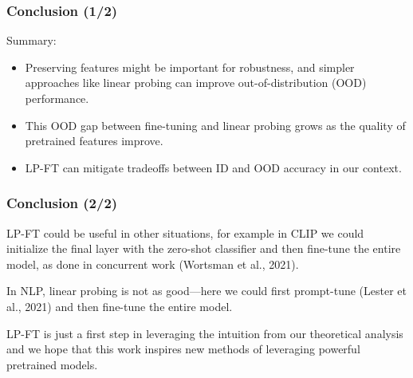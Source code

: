 \documentclass[16pt,aspectratio=169]{beamer}
\begin{document}
\begin{frame}
    \frametitle{Conclusion (1/2)}

    Summary:

    \begin{itemize}
        \item Preserving features might be important for robustness, and simpler approaches like linear probing can improve out-of-distribution (OOD) performance.
        \item This OOD gap between fine-tuning and linear probing grows as the quality of pretrained features improve.
        \item LP-FT can mitigate tradeoffs between ID and OOD accuracy in our context.
    \end{itemize}
    
\end{frame}

\begin{frame}
    \frametitle{Conclusion (2/2)}

    LP-FT could be useful in other situations, for example in CLIP we could initialize the final layer with the zero-shot classifier and then fine-tune the entire model, as done in concurrent work (Wortsman et al., 2021).
    
    In NLP, linear probing is not as good---here we could first prompt-tune (Lester et al., 2021) and then fine-tune the entire model.
    
    LP-FT is just a first step in leveraging the intuition from our theoretical analysis and we hope that this work inspires new methods of leveraging powerful pretrained models.

\end{frame}
\end{document}
